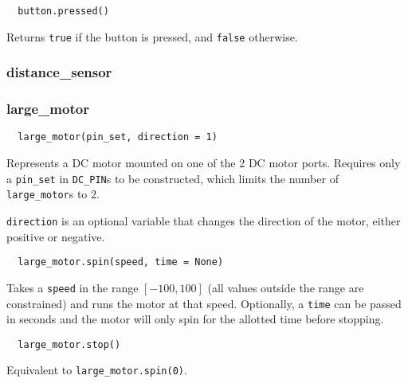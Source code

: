 \documentclass[12pt]{scrartcl} %
\begin{document}
\begin{verbatim}
  button.pressed()
\end{verbatim}

Returns \texttt{true} if the button is pressed, and
\texttt{false} otherwise.

\subsubsection{distance\_sensor}

\subsubsection{large\_motor}

\begin{verbatim}
  large_motor(pin_set, direction = 1)
\end{verbatim}

Represents a DC motor mounted on one of the 2 DC motor ports. Requires only a
\texttt{pin_set} in \texttt{DC_PIN}s to be constructed,
which limits the number of \texttt{large_motor}s to 2.

\texttt{direction} is an optional variable that changes the
direction of the motor, either positive or negative.

\begin{verbatim}
  large_motor.spin(speed, time = None)
\end{verbatim}

Takes a \texttt{speed} in the range $[-100, 100]$ (all values
outside the range are constrained) and runs the motor at that speed.
Optionally, a \texttt{time} can be passed in seconds and the motor
will only spin for the allotted time before stopping.

\begin{verbatim}
  large_motor.stop()
\end{verbatim}

Equivalent to \texttt{large_motor.spin(0)}.
\end{document}
